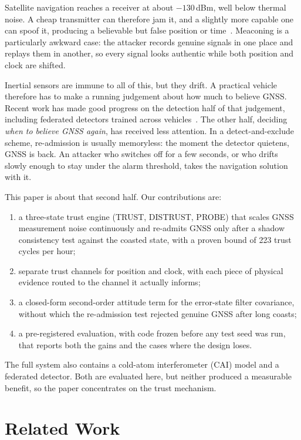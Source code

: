 \documentclass[conference]{IEEEtran}
\begin{document}
Satellite navigation reaches a receiver at about $-130$\,dBm, well below thermal noise. A cheap transmitter can therefore jam it, and a slightly more capable one can spoof it, producing a believable but false position or time~\cite{psiaki2016gnss,humphreys2008assessing}. Meaconing is a particularly awkward case: the attacker records genuine signals in one place and replays them in another, so every signal looks authentic while both position and clock are shifted.

Inertial sensors are immune to all of this, but they drift. A practical vehicle therefore has to make a running judgement about how much to believe GNSS. Recent work has made good progress on the detection half of that judgement, including federated detectors trained across vehicles~\cite{khan2025enhancing,chai2025navigation,liu2026g2fl}. The other half, deciding \emph{when to believe GNSS again}, has received less attention. In a detect-and-exclude scheme, re-admission is usually memoryless: the moment the detector quietens, GNSS is back. An attacker who switches off for a few seconds, or who drifts slowly enough to stay under the alarm threshold, takes the navigation solution with it.

This paper is about that second half. Our contributions are:
\begin{enumerate}
\item a three-state trust engine (TRUST, DISTRUST, PROBE) that scales GNSS measurement noise continuously and re-admits GNSS only after a shadow consistency test against the coasted state, with a proven bound of 223 trust cycles per hour;
\item separate trust channels for position and clock, with each piece of physical evidence routed to the channel it actually informs;
\item a closed-form second-order attitude term for the error-state filter covariance, without which the re-admission test rejected genuine GNSS after long coasts;
\item a pre-registered evaluation, with code frozen before any test seed was run, that reports both the gains and the cases where the design loses.
\end{enumerate}
The full system also contains a cold-atom interferometer (CAI) model and a federated detector. Both are evaluated here, but neither produced a measurable benefit, so the paper concentrates on the trust mechanism.

\section{Related Work}
\end{document}
